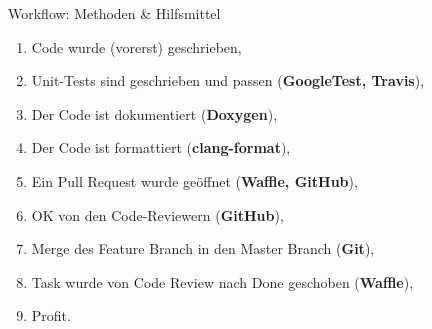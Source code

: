 \begin{slide}{Workflow: Methoden \& Hilfsmittel}

  \small
  \begin{enumerate}
    \item<3-> Code wurde (vorerst) geschrieben,
    \item<4-> Unit-Tests sind geschrieben und passen (\textbf{GoogleTest, Travis}),
    \item<5-> Der Code ist dokumentiert (\textbf{Doxygen}),
    \item<6-> Der Code ist formattiert (\textbf{clang-format}),
    \item<7-> Ein Pull Request wurde ge\"{o}ffnet (\textbf{Waffle, GitHub}),
    \item<8-> OK von den Code-Reviewern (\textbf{GitHub}),
    \item<9-> Merge des Feature Branch in den Master Branch (\textbf{Git}),
    \item<10-> Task wurde von Code Review nach Done geschoben (\textbf{Waffle}),
    \item<11-> Profit.
  \end{enumerate}
\end{slide}
